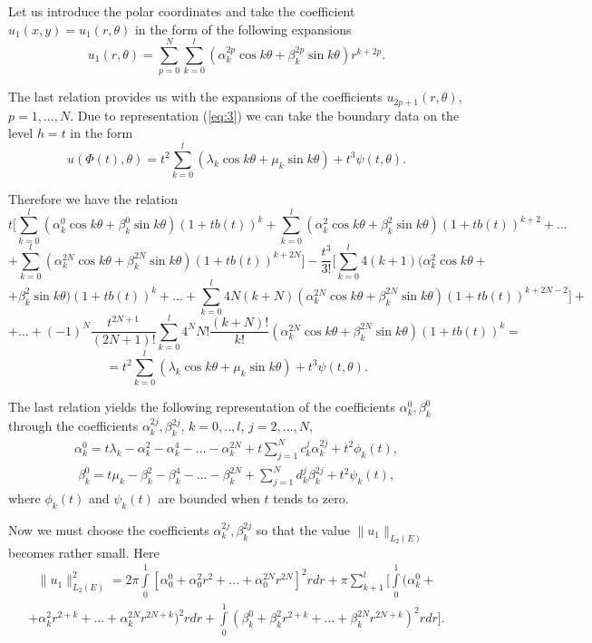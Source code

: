 \documentclass{amsart}
\begin{document}
Let us introduce the polar coordinates and take the coefficient
$u_1(x,y)=u_1(r,\theta)$ in the  form of the following expansions
$$
u_1(r,\theta)=\sum\limits_{p=0}^{N}\sum\limits_{k=0}^l(\alpha_k^{2p}
\cos k\theta+\beta_k^{2p}\sin k\theta) r^{k+2p}.
$$

The last relation provides us with the expansions of the
coefficients $u_{2p+1}(r,\theta)$, $p=1,...,N$. Due to
representation (\ref{eq:3}) we can take the boundary data on the
level $h=t$ in the form
$$
u(\Phi(t),\theta)=t^2\sum_{k=0}^l(\lambda_k\cos k\theta+\mu_k\sin
k\theta) + t^3\psi(t,\theta).
$$

Therefore we have the relation
$$
t[\sum\limits_{k=0}^l(\alpha_k^0 \cos k\theta+\beta_k^0 \sin
k\theta)(1+t b(t))^k+\sum\limits_{k=0}^l(\alpha_k^2 \cos
k\theta+\beta_k^2 \sin k\theta)(1+t b(t))^{k+2}+...
$$
$$
+\sum\limits_{k=0}^l(\alpha_k^{2N} \cos k\theta+\beta_k^{2N} \sin
k\theta)(1+t
b(t))^{k+2N}]-\frac{t^3}{3!}[\sum\limits_{k=0}^l4(k+1)(\alpha_k^2
\cos k\theta+
$$
$$
+\beta_k^2 \sin k\theta)(1+t b(t))^k+...+\sum\limits_{k=0}^l4 N
(k+N)(\alpha_k^{2N} \cos k\theta+\beta_k^{2N} \sin k\theta)(1+t
b(t))^{k+2N-2}]+
$$
$$
+...+(-1)^N\frac{t^{2N+1}}{(2N+1)!}\sum\limits_{k=0}^l 4^N
N!\frac{(k+N)!}{k!}(\alpha_k^{2N} \cos k\theta+\beta_k^{2N} \sin
k\theta)(1+t b(t))^k=
$$
$$
=t^2\sum_{k=0}^l(\lambda_k\cos k\theta+\mu_k\sin k\theta) +
t^3\psi(t,\theta).
$$

The last relation yields the following representation of the
coefficients $\alpha_k^0,\beta_k^0$ through the coefficients
$\alpha_k^{2j},\beta_k^{2j}$, $k=0,..,l$, $j=2,...,N$,
\begin{eqnarray}
\alpha_k^0=t\lambda_k -\alpha_k^2-\alpha_k^4-...-\alpha_k^{2N}+t
\sum\limits_{j=1}^N c_k^j \alpha_k^{2j}+t^2 \phi_k(t),\label{eq:4}
\end{eqnarray}
\begin{eqnarray}
\beta_k^0=t\mu_k
-\beta_k^2-\beta_k^4-...-\beta_k^{2N}+\sum\limits_{j=1}^N d_k^j
\beta_k^{2j}+t^2 \psi_k(t),\label{eq:5}
\end{eqnarray}
where $\phi_k(t)$ and
$\psi_k(t)$ are bounded when $t$ tends to zero.

Now we must choose the coefficients $\alpha_k^{2j},\beta_k^{2j}$ so
that the value $\|u_1\|_{L_2(E)}$ becomes rather small. Here
\begin{eqnarray}
\|u_1\|^2_{L_2(E)}=2\pi\int\limits_0^1[\alpha_0^0+\alpha_0^2
r^2+...+\alpha_0^{2N} r^{2N}]^2 r dr +  \pi
\sum\limits_{k+1}^{l}[\int\limits_0^1(\alpha_k^0+\nonumber
\end{eqnarray}
\begin{eqnarray}
+\alpha_k^2 r^{2+k}+...+\alpha_k^{2N} r^{2N+k})^2 r
dr+\int\limits_0^1(\beta_k^0+\beta_k^2 r^{2+k}+...+\beta_k^{2N}
r^{2N+k})^2 r dr].\label{eq:6}
\end{eqnarray}
\end{document}
